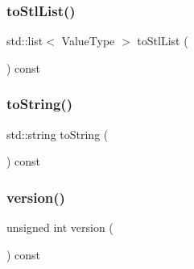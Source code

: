 \mbox{\label{classLinkedList_acaacac140f8ee61f1d0d8ecc94b6b95e}} 
\subsubsection{\texorpdfstring{to\+Stl\+List()}{toStlList()}}
{\footnotesize\ttfamily std\+::list$<$ Value\+Type $>$ to\+Stl\+List (\begin{DoxyParamCaption}{ }\end{DoxyParamCaption}) const}

\mbox{\label{classLinkedList_a1fe5121d6528fdea3f243321b3fa3a49}} 
\subsubsection{\texorpdfstring{to\+String()}{toString()}}
{\footnotesize\ttfamily std\+::string to\+String (\begin{DoxyParamCaption}{ }\end{DoxyParamCaption}) const}

\mbox{\label{classLinkedList_a0aa696ccb72cbf928535d6b646bac1aa}} 
\subsubsection{\texorpdfstring{version()}{version()}}
{\footnotesize\ttfamily unsigned int version (\begin{DoxyParamCaption}{ }\end{DoxyParamCaption}) const}

